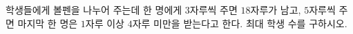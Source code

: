 학생들에게 볼펜을 나누어 주는데 한 명에게 $3$자루씩 주면 $18$자루가 남고, $5$자루씩 주면 마지막 한 명은 $1$자루 이상 $4$자루 미만을 받는다고 한다. 최대 학생 수를 구하시오.
